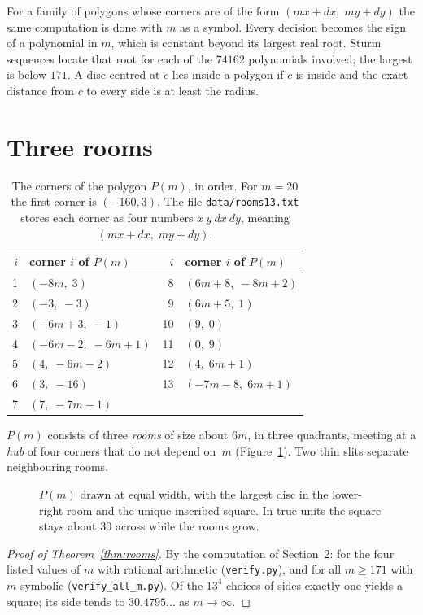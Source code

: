 \documentclass[11pt,a4paper]{article}
\theoremstyle{remark}\newtheorem{remark}[theorem]{Remark}
\begin{document}
For a family of polygons whose corners are of the form $(mx+dx,\;my+dy)$ the same computation is done with $m$ as
a symbol. Every decision becomes the sign of a polynomial in $m$, which is
constant beyond its largest real root. Sturm sequences locate that root for each
of the $74162$ polynomials involved; the largest is below $171$. A disc centred at $c$ lies inside a
polygon if $c$ is inside and the exact distance from $c$ to every side is at
least the radius.

\section{Three rooms}

\begin{table}[H]\centering\small
\begin{tabular}{rl@{\qquad\qquad}rl}\toprule
$i$&corner $i$ of $P(m)$&$i$&corner $i$ of $P(m)$\\\midrule
1&$(-8m,\;3)$&8&$(6m+8,\;-8m+2)$\\
2&$(-3,\;-3)$&9&$(6m+5,\;1)$\\
3&$(-6m+3,\;-1)$&10&$(9,\;0)$\\
4&$(-6m-2,\;-6m+1)$&11&$(0,\;9)$\\
5&$(4,\;-6m-2)$&12&$(4,\;6m+1)$\\
6&$(3,\;-16)$&13&$(-7m-8,\;6m+1)$\\
7&$(7,\;-7m-1)$\\\bottomrule
\end{tabular}
\caption{The corners of the polygon $P(m)$, in order. For $m=20$ the first corner is
$(-160,3)$. The file \texttt{data/rooms13.txt} stores each corner as four numbers
$x\ y\ dx\ dy$, meaning $(mx+dx,\;my+dy)$.}\label{tab:rooms}
\end{table}

$P(m)$ consists of three \emph{rooms} of size about $6m$, in three quadrants,
meeting at a \emph{hub} of four corners that do not depend on~$m$
(Figure~\ref{fig:rooms}). Two thin slits separate neighbouring rooms.

\begin{figure}[H]\centering
\caption{$P(m)$ drawn at equal width, with the largest disc in the lower-right room and the
unique inscribed square. In true units the square stays about $30$ across while
the rooms grow.}\label{fig:rooms}
\end{figure}

\begin{proof}[Proof of Theorem~\ref{thm:rooms}]
By the computation of Section~2: for the four listed values of $m$ with rational
arithmetic (\texttt{verify.py}), and for all $m\ge171$ with $m$ symbolic
(\texttt{verify\_all\_m.py}). Of the $13^4$ choices of sides exactly one yields a
square; its side tends to $30.4795\ldots$ as $m\to\infty$.
\end{proof}
\end{document}
